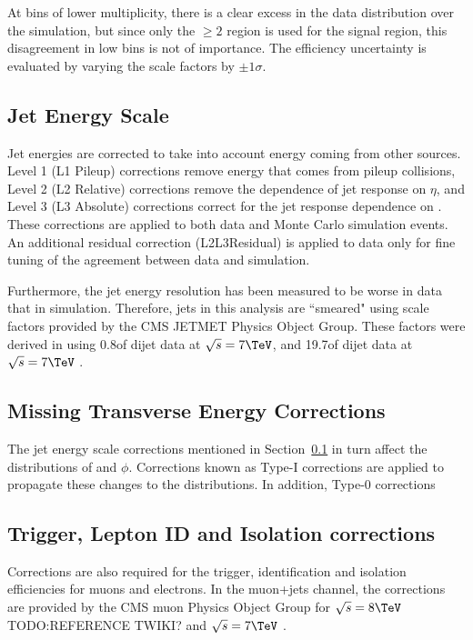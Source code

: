 At bins of lower multiplicity, there is a clear excess in the data distribution over the simulation, but since
only the $\geq2$ \btags region is used for the signal region, this disagreement in low bins is not of
importance.  %
The \btagging efficiency uncertainty is evaluated by varying the scale factors by $\pm1\sigma$.

\subsection{Jet Energy Scale}
\label{sss:jet_energy_scale}
Jet energies are corrected to take into account energy coming from other sources. Level 1 (L1 Pileup)
corrections remove energy that comes from pileup collisions, Level 2 (L2 Relative) corrections remove the
dependence of jet response on $\eta$, and Level 3 (L3 Absolute) corrections correct for the jet response
dependence on \pt \cite{Chatrchyan:2011ds}. These corrections are applied to both data and Monte Carlo
simulation events. An additional residual correction (L2L3Residual) is applied to data only for fine tuning of the agreement between data and
simulation.

Furthermore, the jet energy resolution has been measured to be worse in data that in simulation.
Therefore, jets in this analysis are ``smeared" using scale factors provided by the CMS JETMET Physics Object
Group. These factors were derived in \cite{Chatrchyan:2011ds} using 0.8\fbinv of dijet data at
$\sqrt{s}=7\TeV$, and 19.7\fbinv of dijet data at $\sqrt{s}=7\TeV$ \cite{jet_res_2012}.

\subsection{Missing Transverse Energy Corrections}
\label{ss:met_corrections}
The jet energy scale corrections mentioned in Section~\ref{sss:jet_energy_scale} in turn affect the
distributions of \met and \met $\phi$. Corrections known as Type-I \met corrections are applied to propagate
these changes to the \met distributions. In addition, Type-0 corrections 
 
\subsection{Trigger, Lepton ID and Isolation corrections}
\label{ss:trigger_ID_isolation_corrections}
Corrections are also required for the trigger, identification and isolation efficiencies for muons and
electrons. In the muon+jets channel, the corrections are provided by the CMS muon Physics Object Group
for $\sqrt{s}=8\TeV$ TODO:REFERENCE TWIKI? %
and $\sqrt{s}=7\TeV$ \cite{CMS-PAS-SMP-13-013}.

